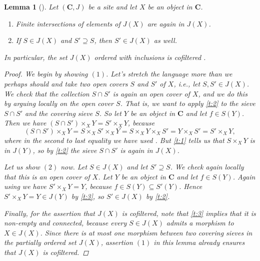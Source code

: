 \documentclass[12pt,reqno,a4paper]{amsart}
\theoremstyle{plain}
\newtheorem{lm}[thm]{Lemma}
\theoremstyle{definition}
\theoremstyle{remark}
\begin{document}
\begin{lm}[{\cite[\href{https://stacks.math.columbia.edu/tag/00Z5}{Tag 00Z5}]{stacks-project}}]\label{lm:cofiltered}
  Let $(\mathbf{C},J)$ be a site and let $X$ be an object in $\mathbf{C}$.
  \begin{enumerate}
    \item Finite intersections of elements of $J(X)$ are again in $J(X)$.
    \item If $S \in J(X)$ and $S' \supseteq S$, then $S' \in J(X)$ as well.
  \end{enumerate}
  In particular, the set $J(X)$ ordered with inclusions is cofiltered \cite[\href{https://stacks.math.columbia.edu/tag/04AZ}{Tag 04AZ}]{stacks-project}.
  \begin{proof}
    We begin by showing $(1)$.
    Let's stretch the language more than we perhaps should and take two open covers $S$ and $S'$ of $X$, i.e., let $S, S' \in J(X)$.
    We check that the collection $S \cap S'$ is again an open cover of $X$, and we do this by arguing locally on the open cover $S$.
    That is, we want to apply \ref{t:2} to the sieve $S \cap S'$ and the covering sieve $S$.
    So let $Y$ be an object in $\mathbf{C}$ and let $f \in S(Y)$.
    Then we have $(S \cap S') \times_{X} Y = S' \times_{X} Y$, because
    \[ (S \cap S') \times_{X} Y = S \times_{X} S' \times_{X} Y = S \times_{X} Y \times_{X} S' = Y \times_{X} S' = S' \times_{X} Y, \]
    where in the second to last equality we have used .
    But \ref{t:1} tells us that $S \times_{X} Y$ is in $J(Y)$, so by \ref{t:2} the sieve $S \cap S'$ is again in $J(X)$.

    Let us show $(2)$ now.
    Let $S \in J(X)$ and let $S' \supseteq S$.
    We check again locally that this is an open cover of $X$.
    Let $Y$ be an object in $\mathbf{C}$ and let $f \in S(Y)$.
    Again using  we have $S' \times_{X} Y = Y$, because $f \in S(Y) \subseteq S'(Y)$.
    Hence $S' \times_{X} Y = Y \in J(Y)$ by \ref{t:3}, so $S' \in J(X)$ by \ref{t:2}.

    Finally, for the assertion that $J(X)$ is cofiltered, note that \ref{t:3} implies that it is non-empty and connected, because every $S \in J(X)$ admits a morphism to $X \in J(X)$.
    Since there is at most one morphism between two covering sieves in the partially ordered set $J(X)$, assertion $(1)$ in this lemma already ensures that $J(X)$ is cofiltered.
  \end{proof}
\end{lm}
\end{document}
